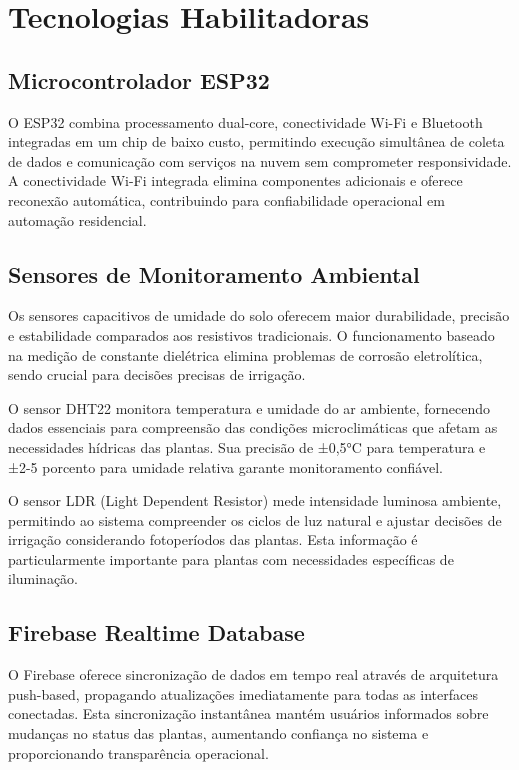 \documentclass[oneside,english,brazilian]{UNISINOSmonografia}
\begin{document}
\section{Tecnologias Habilitadoras}

\subsection{Microcontrolador ESP32}

O ESP32 combina processamento dual-core, conectividade Wi-Fi e Bluetooth integradas em um chip de baixo custo, permitindo execução simultânea de coleta de dados e comunicação com serviços na nuvem sem comprometer responsividade. A conectividade Wi-Fi integrada elimina componentes adicionais e oferece reconexão automática, contribuindo para confiabilidade operacional em automação residencial.

\subsection{Sensores de Monitoramento Ambiental}

Os sensores capacitivos de umidade do solo oferecem maior durabilidade, precisão e estabilidade comparados aos resistivos tradicionais. O funcionamento baseado na medição de constante dielétrica elimina problemas de corrosão eletrolítica, sendo crucial para decisões precisas de irrigação.

O sensor DHT22 monitora temperatura e umidade do ar ambiente, fornecendo dados essenciais para compreensão das condições microclimáticas que afetam as necessidades hídricas das plantas. Sua precisão de ±0,5°C para temperatura e ±2-5 porcento para umidade relativa garante monitoramento confiável.

O sensor LDR (Light Dependent Resistor) mede intensidade luminosa ambiente, permitindo ao sistema compreender os ciclos de luz natural e ajustar decisões de irrigação considerando fotoperíodos das plantas. Esta informação é particularmente importante para plantas com necessidades específicas de iluminação.

\subsection{Firebase Realtime Database}

O Firebase oferece sincronização de dados em tempo real através de arquitetura push-based, propagando atualizações imediatamente para todas as interfaces conectadas. Esta sincronização instantânea mantém usuários informados sobre mudanças no status das plantas, aumentando confiança no sistema e proporcionando transparência operacional.
\end{document}
